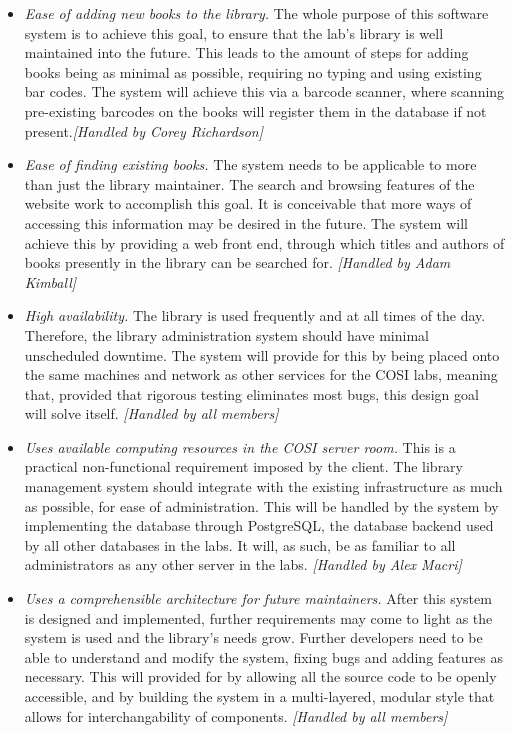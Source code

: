 \documentclass[a4paper, 10pt, oneside, draft]{article}
\begin{document}
\begin{itemize}
    \item \textit{Ease of adding new books to the library.} The whole purpose
        of this software system is to achieve this goal, to ensure that the
        lab's library is well maintained into the future. This leads to the
        amount of steps for adding books being as minimal as possible,
        requiring no typing and using existing bar codes. The system will achieve
	this via a barcode scanner, where scanning pre-existing barcodes on the 
	books will register them in the database if not present.\textit{[Handled by
	Corey Richardson]}
    \item \textit{Ease of finding existing books.} The system needs to be
        applicable to more than just the library maintainer. The search and
        browsing features of the website work to accomplish this goal. It is
        conceivable that more ways of accessing this information may be
        desired in the future. The system will achieve this by providing a web
	front end, through which titles and authors of books presently in the 
	library can be searched for. \textit{[Handled by Adam Kimball]}
    \item \textit{High availability.} The library is used frequently and at
        all times of the day. Therefore, the library administration system
        should have minimal unscheduled downtime. The system will provide for 
	this by being placed onto the same machines and network as other services
	for the COSI labs, meaning that, provided that rigorous testing eliminates
	most bugs, this design goal will solve itself. \textit{[Handled by all members]}
    \item \textit{Uses available computing resources in the COSI server room.}
        This is a practical non-functional requirement imposed by the client.
        The library management system should integrate with the existing
        infrastructure as much as possible, for ease of administration. This will
	be handled by the system by implementing the database through PostgreSQL,
	the database backend used by all other databases in the labs. It will,
	as such, be as familiar to all administrators as any other server in the 
	labs. \textit{[Handled by Alex Macri]}
    \item \textit{Uses a comprehensible architecture for future maintainers.}
        After this system is designed and implemented, further requirements
        may come to light as the system is used and the library's needs grow.
        Further developers need to be able to understand and modify the
        system, fixing bugs and adding features as necessary. This will provided
	for by allowing all the source code to be openly accessible, and by
	building the system in a multi-layered, modular style that allows for
	interchangability of components. \textit{[Handled by all members]}

\end{itemize}
\end{document}
